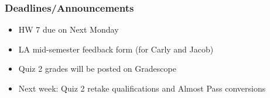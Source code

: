 
\begin{frame}
    \frametitle{Deadlines/Announcements}
    \begin{itemize}
        \item HW 7 due on Next Monday
        \item LA mid-semester feedback form (for Carly and Jacob)
        \item Quiz 2 grades will be posted on Gradescope
        \item Next week: Quiz 2 retake qualifications and Almost Pass conversions
    \end{itemize}
\end{frame}
